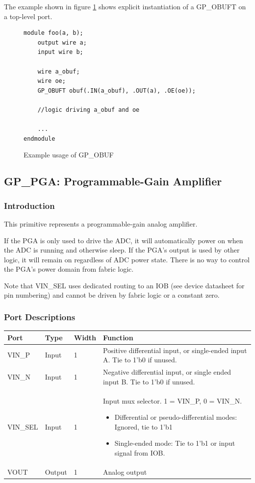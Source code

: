 \documentclass{article}
\begin{document}
The example shown in figure \ref{gp-obuft-example} shows explicit instantiation of a GP\_OBUFT on a top-level port.

\begin{figure}[h]
\begin{lstlisting}
module foo(a, b);
	output wire a;
	input wire b;
	
	wire a_obuf;
	wire oe;
	GP_OBUFT obuf(.IN(a_obuf), .OUT(a), .OE(oe));
	
	//logic driving a_obuf and oe
	
	...
endmodule
\end{lstlisting}
\caption{Example usage of GP\_OBUF}
\label{gp-obuft-example}
\end{figure}


\pagebreak
\clearpage
\subsection{GP\_PGA: Programmable-Gain Amplifier}

\subsubsection{Introduction}
This primitive represents a programmable-gain analog amplifier.

If the PGA is only used to drive the ADC, it will automatically power on when the ADC is running and otherwise sleep. 
If the PGA's output is used by other logic, it will remain on regardless of ADC power state. There is no way to control 
the PGA's power domain from fabric logic.

Note that VIN\_SEL uses dedicated routing to an IOB (see device datasheet for pin numbering) and cannot be driven 
by fabric logic or a constant zero.

\subsubsection{Port Descriptions}

\begin{tabularx}{5in}{|l|l|l|X|}
\hline
{\bfseries Port} & {\bfseries Type} & {\bfseries Width} & {\bfseries Function} \\
\hline
VIN\_P & Input & 1 & Positive differential input, or single-ended input A. Tie to 1'b0 if unused.\\
\hline
VIN\_N & Input & 1 & Negative differential input, or single ended input B. Tie to 1'b0 if unused.\\
\hline
VIN\_SEL & Input & 1 & Input mux selector. 1 = VIN\_P, 0 = VIN\_N.
	\begin{itemize}
		\item Differential or pseudo-differential modes: Ignored, tie to 1'b1
		\item Single-ended mode: Tie to 1'b1 or input signal from IOB.
	\end{itemize}\\
\hline
VOUT & Output & 1 & Analog output\\
\hline
\end{tabularx}
\end{document}
